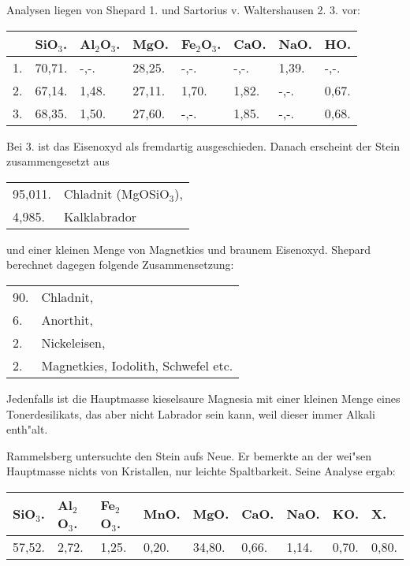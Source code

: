 \documentclass[a4paper, 11pt, oneside]{article}
\begin{document}
Analysen liegen von Shepard 1. und Sartorius v. Waltershausen 2. 3. vor:
\begin{table}[!ht]
    \centering
    \begin{tabular}{l l l l l l l l}
         & SiO$_{3}$. & Al$_{2}$O$_{3}$. & MgO. & Fe$_{2}$O$_{3}$. & CaO. & NaO. & HO. \\ \hline
        1. & 70,71. & -,-. & 28,25. & -,-. & -,-. & 1,39. & -,-. \\
        2. & 67,14. & 1,48. & 27,11. & 1,70. & 1,82. & -,-. & 0,67. \\
        3. & 68,35. & 1,50. & 27,60. & -,-. & 1,85. & -,-. & 0,68. \\
    \end{tabular}
\end{table}

Bei 3. ist das Eisenoxyd als fremdartig ausgeschieden. Danach erscheint der Stein zusammengesetzt aus
\begin{table}[!ht]
    \centering
    \begin{tabular}{l l}
        95,011. & Chladnit (MgOSiO$_{3}$), \\
        4,985. & Kalklabrador \\
    \end{tabular}
\end{table}
 
und einer kleinen Menge von Magnetkies und braunem Eisenoxyd. Shepard berechnet dagegen folgende Zusammensetzung:
\begin{table}[!ht]
    \centering
    \begin{tabular}{l l}
        90. & Chladnit, \\
        6. & Anorthit, \\
        2. & Nickeleisen, \\
        2. & Magnetkies, Iodolith, Schwefel etc. \\
    \end{tabular}
\end{table}

Jedenfalls ist die Hauptmasse kieselsaure Magnesia mit einer kleinen Menge eines Tonerdesilikats, das aber nicht Labrador sein kann, weil dieser immer Alkali enth"alt.

Rammelsberg untersuchte den Stein aufs Neue. Er bemerkte an der wei"sen Hauptmasse nichts von Kristallen, nur leichte Spaltbarkeit. Seine Analyse ergab:
\begin{table}[!ht]
    \centering
    \begin{tabular}{l l l l l l l l l}
        SiO$_{3}$. & Al$_{2}$O$_{3}$. & Fe$_{2}$O$_{3}$. & MnO. & MgO. & CaO. & NaO. & KO. & X. \\ \hline
        57,52. & 2,72. & 1,25. & 0,20. & 34,80. & 0,66. & 1,14. & 0,70. & 0,80. \\
    \end{tabular}
\end{table}
\end{document}

